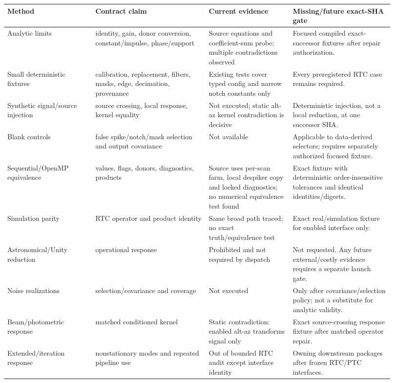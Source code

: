 \documentclass[11pt]{article}
\begin{document}
\begin{longtable}{@{}L{0.21\linewidth}L{0.27\linewidth}L{0.20\linewidth}L{0.24\linewidth}@{}}
\toprule
Method & Contract claim & Current evidence & Missing/future exact-SHA gate \\
\midrule
\endhead
Analytic limits & identity, gain, donor conversion, constant/impulse, phase/support & Source equations and coefficient-sum probe; multiple contradictions observed & Focused compiled exact-successor fixtures after repair authorization. \\
Small deterministic fixtures & calibration, replacement, filters, masks, edge, decimation, provenance & Existing tests cover typed config and narrow notch constants only & Every preregistered RTC case remains required. \\
Synthetic signal/source injection & source crossing, local response, kernel equality & Not executed; static alt-az kernel contradiction is decisive & Deterministic injection, not a local reduction, at one successor SHA. \\
Blank controls & false spike/notch/mask selection and output covariance & Not available & Applicable to data-derived selectors; requires separately authorized focused fixture. \\
Sequential/OpenMP equivalence & values, flags, donors, diagnostics, products & Source uses per-scan farm, local despiker copy and locked diagnostics; no numerical equivalence test found & Exact fixture with deterministic order-insensitive tolerances and identical identities/digests. \\
Simulation parity & RTC operator and product identity & Same broad path traced; no exact truth/equivalence test & Exact real/simulation fixture for enabled interface only. \\
Astronomical/Unity reduction & operational response & Prohibited and not required by dispatch & Not requested. Any future external/costly evidence requires a separate launch gate. \\
Noise realizations & selection/covariance and coverage & Not executed & Only after covariance/selection policy; not a substitute for analytic validity. \\
Beam/photometric response & matched conditioned kernel & Static contradiction: enabled alt-az transforms signal only & Exact source-crossing response fixture after matched operator repair. \\
Extended/iteration response & nonstationary modes and repeated pipeline use & Out of bounded RTC audit except interface identity & Owning downstream packages after frozen RTC/PTC interfaces. \\
\bottomrule
\end{longtable}
\end{document}
